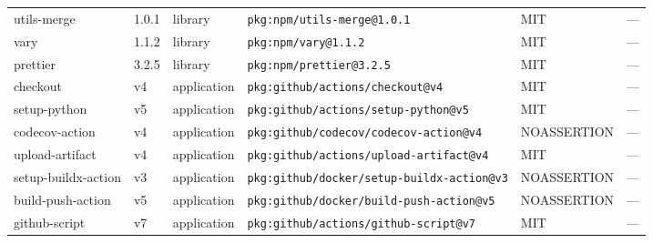 \documentclass[11pt,a4paper]{article}
\begin{document}
\begin{longtable}{|p{4cm}|p{2cm}|p{1.6cm}|p{5cm}|p{1.5cm}|p{3.5cm}|}
\raggedright utils-merge & 1.0.1 & library & \small\texttt{pkg:npm/utils-merge@1.0.1} & MIT & \small — \\
\raggedright vary & 1.1.2 & library & \small\texttt{pkg:npm/vary@1.1.2} & MIT & \small — \\
\raggedright prettier & 3.2.5 & library & \small\texttt{pkg:npm/prettier@3.2.5} & MIT & \small — \\
\raggedright checkout & v4 & application & \small\texttt{pkg:github/actions/checkout@v4} & MIT & \small — \\
\raggedright setup-python & v5 & application & \small\texttt{pkg:github/actions/setup-python@v5} & MIT & \small — \\
\raggedright codecov-action & v4 & application & \small\texttt{pkg:github/codecov/codecov-action@v4} & NOASSERTION & \small — \\
\raggedright upload-artifact & v4 & application & \small\texttt{pkg:github/actions/upload-artifact@v4} & MIT & \small — \\
\raggedright setup-buildx-action & v3 & application & \small\texttt{pkg:github/docker/setup-buildx-action@v3} & NOASSERTION & \small — \\
\raggedright build-push-action & v5 & application & \small\texttt{pkg:github/docker/build-push-action@v5} & NOASSERTION & \small — \\
\raggedright github-script & v7 & application & \small\texttt{pkg:github/actions/github-script@v7} & MIT & \small — \\
\end{longtable}
\end{document}
